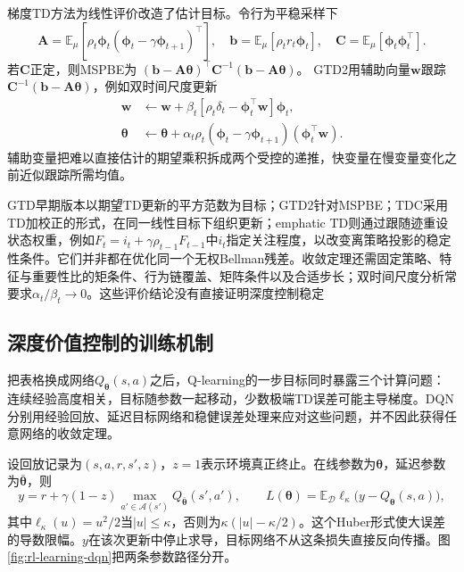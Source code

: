 梯度TD方法为线性评价改造了估计目标。令行为平稳采样下
\[
  \bm{A}=\mathbb E_\mu[\rho_t\bm{\phi}_t
          (\bm{\phi}_t-\gamma\bm{\phi}_{t+1})^\top],\quad
  \bm{b}=\mathbb E_\mu[\rho_t r_t\bm{\phi}_t],\quad
  \bm{C}=\mathbb E_\mu[\bm{\phi}_t\bm{\phi}_t^\top].
\]
若$\bm C$正定，则MSPBE为
$(\bm b-\bm A\bm\theta)^\top\bm C^{-1}
 (\bm b-\bm A\bm\theta)$。
GTD2用辅助向量$\bm w$跟踪$\bm C^{-1}(\bm b-\bm A\bm\theta)$，例如双时间尺度更新
\begin{align}
  \bm w&\leftarrow\bm w+\beta_t
     [\rho_t\delta_t-\bm\phi_t^\top\bm w]\bm\phi_t,
     \nonumber\\
  \bm\theta&\leftarrow\bm\theta+\alpha_t\rho_t
     (\bm\phi_t-\gamma\bm\phi_{t+1})(\bm\phi_t^\top\bm w).
  \label{eq:rl-learning-gtd2}
\end{align}
辅助变量把难以直接估计的期望乘积拆成两个受控的递推，快变量在慢变量变化之前近似跟踪所需均值。

GTD早期版本以期望TD更新的平方范数为目标；GTD2针对MSPBE；TDC采用TD加校正的形式，在同一线性目标下组织更新；emphatic TD则通过跟随迹重设状态权重，例如$F_t=i_t+\gamma\rho_{t-1}F_{t-1}$中$i_t$指定关注程度，以改变离策略投影的稳定性条件。它们并非都在优化同一个无权Bellman残差。收敛定理还需固定策略、特征与重要性比的矩条件、行为链覆盖、矩阵条件以及合适步长；双时间尺度分析常要求$\alpha_t/\beta_t\to0$。这些评价结论没有直接证明深度控制稳定

\subsection{深度价值控制的训练机制}
\label{sec:rl-learning-dqn}

把表格换成网络$Q_{\bm\theta}(s,a)$之后，Q-learning的一步目标同时暴露三个计算问题：连续经验高度相关，目标随参数一起移动，少数极端TD误差可能主导梯度。DQN分别用经验回放、延迟目标网络和稳健误差处理来应对这些问题，并不因此获得任意网络的收敛定理。

设回放记录为$(s,a,r,s',z)$，$z=1$表示环境真正终止。在线参数为$\bm\theta$，延迟参数为$\bar{\bm\theta}$，则
\begin{equation}
  y=r+\gamma(1-z)\max_{a'\in\mathcal A(s')}Q_{\bar{\bm\theta}}(s',a'),
  \qquad
  L(\bm\theta)=\mathbb E_{\mathcal D}
       \ell_\kappa\bigl(y-Q_{\bm\theta}(s,a)\bigr),
  \label{eq:rl-learning-dqn-loss}
\end{equation}
其中$\ell_\kappa(u)=u^2/2$当$|u|\leq\kappa$，否则为$\kappa(|u|-\kappa/2)$。这个Huber形式使大误差的导数限幅。$y$在该次更新中停止求导，目标网络不从这条损失直接反向传播。图\ref{fig:rl-learning-dqn}把两条参数路径分开。

